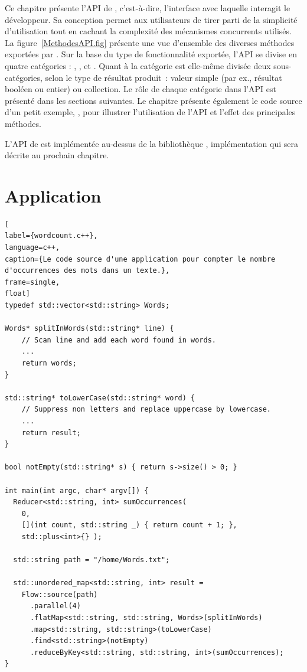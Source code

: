 Ce chapitre pr\'esente l'API de \ppff,  c'est-\`a-dire, l'interface avec laquelle interagit le d\'eveloppeur. Sa conception permet aux utilisateurs de tirer parti de la simplicit\'e d'utilisation tout en cachant la complexit\'e des m\'ecanismes concurrents utilis\'es. La figure~\ref{MethodesAPI.fig} pr\'esente une vue d'ensemble des diverses m\'ethodes export\'ees par \ppff. Sur la base du type de fonctionnalit\'e export\'ee, l'API se divise en quatre cat\'egories :  , ,   et . Quant \`a la cat\'egorie  est elle-m\^eme divis\'ee deux sous-cat\'egories, selon le type de r\'esultat produit~: valeur simple (par ex., r\'esultat bool\'een ou entier) ou collection.
Le r\^ole de chaque cat\'egorie dans l'API est pr\'esent\'e dans les sections suivantes. Le chapitre pr\'esente \'egalement le code source d'un petit exemple, , pour illustrer l'utilisation de l'API et l'effet des principales m\'ethodes.

L'{API} de \PpFf{} est impl\'ement\'ee au-dessus de la biblioth\`eque , impl\'ementation qui sera d\'ecrite au prochain chapitre.



\section{Application }
\label{descriptionWordCount.sect}



\begin{lstlisting}[
label={wordcount.c++},
language=c++,
caption={Le code source d'une application pour compter le nombre d'occurrences des mots dans un texte.},
frame=single,
float]
typedef std::vector<std::string> Words;

Words* splitInWords(std::string* line) {
    // Scan line and add each word found in words.
    ...
    return words;
}

std::string* toLowerCase(std::string* word) {
    // Suppress non letters and replace uppercase by lowercase.
    ...
    return result;
}

bool notEmpty(std::string* s) { return s->size() > 0; }

int main(int argc, char* argv[]) {
  Reducer<std::string, int> sumOccurrences(
    0, 
    [](int count, std::string _) { return count + 1; },
    std::plus<int>{} );

  std::string path = "/home/Words.txt"; 

  std::unordered_map<std::string, int> result = 
    Flow::source(path) 
      .parallel(4)
      .flatMap<std::string, std::string, Words>(splitInWords)
      .map<std::string, std::string>(toLowerCase)
      .find<std::string>(notEmpty)
      .reduceByKey<std::string, std::string, int>(sumOccurrences);
}
\end{lstlisting}



